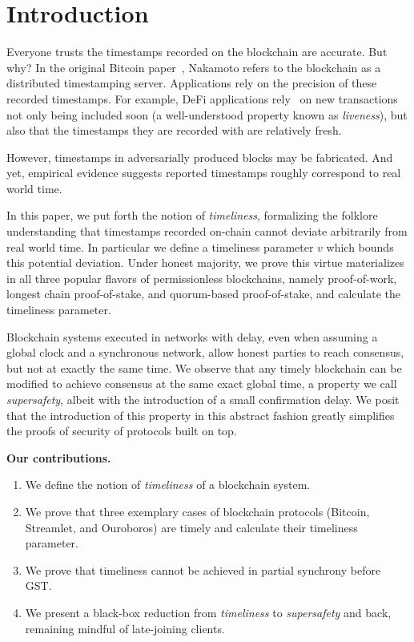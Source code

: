 \section{Introduction}
Everyone trusts the timestamps recorded on the
blockchain are accurate. But why?
In the original Bitcoin paper~\cite{bitcoin}, Nakamoto refers to the
blockchain as a distributed timestamping server.
Applications rely on the precision of these recorded timestamps.
For example, DeFi applications rely~\cite{0x-timestamp} on new transactions not only
being included soon (a well-understood property known as \emph{liveness}),
but also that the timestamps they are recorded with are relatively fresh.

However, timestamps in adversarially produced blocks may be fabricated.
And yet, empirical evidence suggests reported timestamps roughly correspond
to real world time.

In this paper, we put forth the notion of \emph{timeliness}, formalizing the folklore
understanding that timestamps recorded on-chain cannot deviate arbitrarily
from real world time. In particular we define a timeliness parameter $v$ which bounds
this potential deviation. Under honest majority, we prove this virtue materializes in all three popular flavors of
permissionless blockchains, namely proof-of-work,
longest chain proof-of-stake, and quorum-based proof-of-stake, and calculate the
timeliness parameter.

Blockchain systems executed in networks with delay, even when assuming a global clock and
a synchronous network, allow honest parties to reach consensus, but not at exactly
the same time. We observe that any timely blockchain can be modified to achieve
consensus at the same exact global time, a property we call \emph{supersafety},
albeit with the introduction of a small confirmation delay. We posit that the introduction of this
property in this abstract fashion greatly simplifies the proofs of security of protocols built on top.

\noindent
\textbf{Our contributions.}

\begin{enumerate}
  \item We define the notion of \emph{timeliness} of a blockchain system.
  \item We prove that three exemplary cases of blockchain protocols (Bitcoin, Streamlet, and Ouroboros)
        are timely and calculate their timeliness parameter.
  \item We prove that timeliness cannot be achieved in partial synchrony before GST.
  \item We present a black-box reduction from \emph{timeliness} to \emph{supersafety} and back,
        remaining mindful of late-joining clients.
\end{enumerate}

